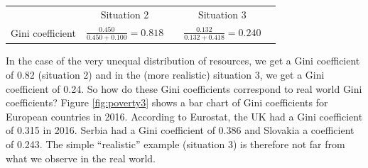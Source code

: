 \documentclass[]{book}
\begin{document}
\begin{longtable}[]{@{}ccccc@{}}
\begin{minipage}[t]{0.16\columnwidth}\centering
\strut
\end{minipage} & \begin{minipage}[t]{0.16\columnwidth}\centering
Situation 2\strut
\end{minipage} & \begin{minipage}[t]{0.16\columnwidth}\centering
\strut
\end{minipage} & \begin{minipage}[t]{0.16\columnwidth}\centering
Situation 3\strut
\end{minipage} & \begin{minipage}[t]{0.20\columnwidth}\centering
\strut
\end{minipage}\tabularnewline
\begin{minipage}[t]{0.16\columnwidth}\centering
Gini coefficient\strut
\end{minipage} & \begin{minipage}[t]{0.16\columnwidth}\centering
\(\frac{0.450}{0.450+0.100}=0.818\)\strut
\end{minipage} & \begin{minipage}[t]{0.16\columnwidth}\centering
\strut
\end{minipage} & \begin{minipage}[t]{0.16\columnwidth}\centering
\(\frac{0.132}{0.132+0.418}=0.240\)\strut
\end{minipage} & \begin{minipage}[t]{0.20\columnwidth}\centering
\strut
\end{minipage}\tabularnewline
\bottomrule
\end{longtable}

In the case of the very unequal distribution of resources, we get a Gini coefficient of 0.82 (situation 2) and in the (more realistic) situation 3, we get a Gini coefficient of 0.24. So how do these Gini coefficients correspond to real world Gini coefficients? Figure \ref{fig:poverty3} shows a bar chart of Gini coefficients for European countries in 2016. According to Eurostat, the UK had a Gini coefficient of 0.315 in 2016. Serbia had a Gini coefficient of 0.386 and Slovakia a coefficient of 0.243. The simple ``realistic'' example (situation 3) is therefore not far from what we observe in the real world.
\end{document}
